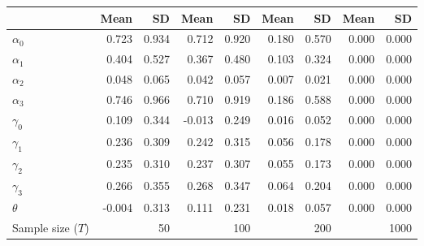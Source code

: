 
\begin{tabular}[t]{lrrrrrrrr}
\toprule
  & Mean & SD & Mean  & SD  & Mean   & SD   & Mean    & SD   \\
\midrule
$\alpha_{0}$ & 0.723 & 0.934 & 0.712 & 0.920 & 0.180 & 0.570 & 0.000 & 0.000\\
$\alpha_{1}$ & 0.404 & 0.527 & 0.367 & 0.480 & 0.103 & 0.324 & 0.000 & 0.000\\
$\alpha_{2}$ & 0.048 & 0.065 & 0.042 & 0.057 & 0.007 & 0.021 & 0.000 & 0.000\\
$\alpha_{3}$ & 0.746 & 0.966 & 0.710 & 0.919 & 0.186 & 0.588 & 0.000 & 0.000\\
$\gamma_{0}$ & 0.109 & 0.344 & -0.013 & 0.249 & 0.016 & 0.052 & 0.000 & 0.000\\
$\gamma_{1}$ & 0.236 & 0.309 & 0.242 & 0.315 & 0.056 & 0.178 & 0.000 & 0.000\\
$\gamma_{2}$ & 0.235 & 0.310 & 0.237 & 0.307 & 0.055 & 0.173 & 0.000 & 0.000\\
$\gamma_{3}$ & 0.266 & 0.355 & 0.268 & 0.347 & 0.064 & 0.204 & 0.000 & 0.000\\
$\theta$ & -0.004 & 0.313 & 0.111 & 0.231 & 0.018 & 0.057 & 0.000 & 0.000\\
Sample size ($T$) &  & 50 &  & 100 &  & 200 &  & 1000\\
\bottomrule
\end{tabular}
